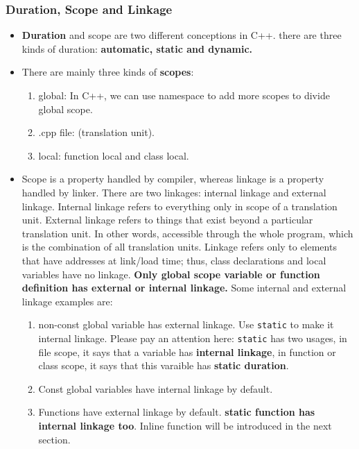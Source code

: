 \documentclass[a4paper,11pt,twoside]{book}
\begin{document}
\subsubsection{Duration, Scope and Linkage}
\begin{itemize}
	\item \textbf{Duration} and scope are two different conceptions in C++. there are three kinds of duration: \textbf{automatic, static and dynamic.}
        \item There are mainly three kinds of \textbf{scopes}:
	\begin{enumerate}
		\item global: In C++, we can use namespace to add more scopes to divide global scope.
		\item .cpp file: (translation unit).
		\item local: function local and class local. 
	\end{enumerate}

	\item Scope is a property handled by compiler, whereas linkage is a property handled by linker. There are two linkages: internal linkage and external linkage. Internal linkage refers to everything only in scope of a translation unit. External linkage refers to things that exist beyond a particular translation unit. In other words, accessible through the whole program, which is the combination of all translation units. Linkage refers only to elements that have addresses at link/load time; thus, class declarations and local variables have no linkage. \textbf{Only global scope variable or function definition has external or internal linkage. } Some internal and external linkage examples are:
	
\begin{enumerate}
	\item non-const global variable has external linkage. Use \texttt{static} to make it internal linkage. Please pay an attention here: \texttt{static} has two usages, in file scope, it says that a variable has \textbf{internal linkage}, in function or class scope, it says that this varaible has \textbf{static duration}.
	
	\item Const global variables have internal linkage by default.
	
	\item Functions have external linkage by default. \textbf{static function has internal linkage too}. Inline function will be introduced in the next section. 
\end{enumerate}


\end{itemize}
\end{document}
